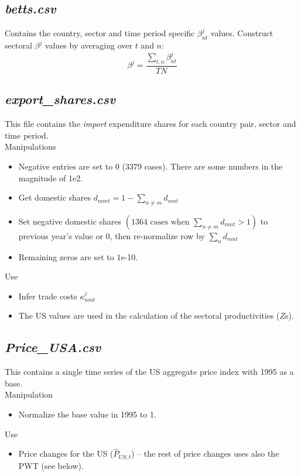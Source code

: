 \documentclass[11pt,oneside,a4paper]{article}
\begin{document}
\subsection{\textsl{betts.csv}}
Contains the country, sector and time period specific $\beta^j_{nt}$ values.
Construct sectoral $\beta^j$ values by averaging over $t$ and $n$: $$\beta^j = \frac{\sum_{t, n}\beta^j_{nt}}{TN}$$

\subsection{\textsl{export\_shares.csv}}
This file contains the \emph{import} expenditure shares for each country pair, sector and time period.\\
Manipulations
\begin{itemize}
  \item Negative entries are set to 0 (3379 cases). There are some numbers in the magnitude of 1e2.
  \item Get domestic shares $d_{mmt}  = 1 - \sum_{n \neq m} d_{mnt}$
  \item Set negative domestic shares $\left(1364 \mbox{ cases when }\sum_{n \neq m} d_{mnt} > 1\right)$ to previous year's value or 0, then re-normalize row by $\sum_{n} d_{mnt}$
  \item Remaining zeros are set to 1e-10.
\end{itemize}
Use
\begin{itemize}
  \item Infer trade costs $\kappa_{nmt}^{j}$
  \item The US values are used in the calculation of the sectoral productivities ($Z$s).
\end{itemize}

\subsection{\textsl{Price\_USA.csv}}
This contains a single time series of the US aggregate price index with 1995 as a base. \\
Manipulation
\begin{itemize}
  \item Normalize the base value in 1995 to 1.
\end{itemize}
Use
\begin{itemize}
  \item Price changes for the US ($\hat{P}_{US,t}$) -- the rest of price changes uses also the PWT (see below).
\end{itemize}
\end{document}
